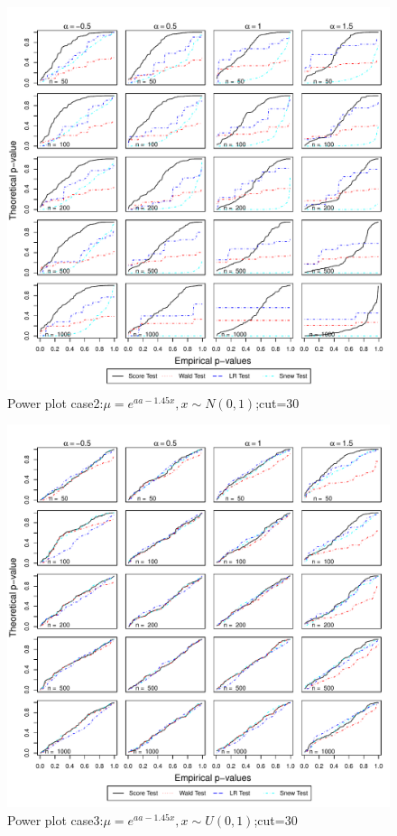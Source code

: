 \documentclass[11pt]{article}
\numberwithin{equation}{section}
\begin{document}
\begin{figure}
  \centering
  \includegraphics[width=\columnwidth]{./figure/q/q302.pdf}
  \caption{Power plot case2:$\mu=e^{aa-1.45x},x\sim N(0,1)$;cut=30}
\end{figure}

\begin{figure}
  \centering
  \includegraphics[width=\columnwidth]{./figure/q/q303.pdf}
  \caption{Power plot case3:$\mu=e^{aa-1.45x},x\sim U(0,1)$;cut=30}
\end{figure}
\end{document}
